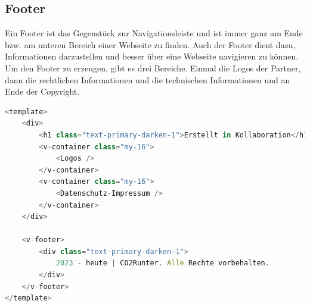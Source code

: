 \subsection{Footer}
Ein Footer ist das Gegenstück zur Navigationsleiste und ist immer ganz am Ende bzw. am unteren Bereich einer Webseite zu finden.
Auch der Footer dient dazu, Informationen darzustellen und besser über eine Webseite navigieren zu können.
Um den Footer zu erzeugen, gibt es drei Bereiche.
Einmal die Logos der Partner, dann die rechtlichen Informationen und die technischen Informationen und an Ende der Copyright.

\begin{lstlisting}[language={JavaScript}, caption={Footer Definition}]
<template>
    <div>
        <h1 class="text-primary-darken-1">Erstellt in Kollaboration</h1>
        <v-container class="my-16">
            <Logos />
        </v-container>
        <v-container class="my-16">
            <Datenschutz-Impressum />
        </v-container>
    </div>

    <v-footer>
        <div class="text-primary-darken-1">
            2023 - heute | CO2Runter. Alle Rechte vorbehalten.
        </div>
    </v-footer>
</template>
\end{lstlisting}

